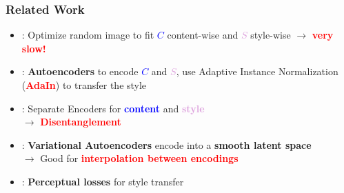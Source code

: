\documentclass[11pt,xcolor=dvipsnames]{beamer}
\begin{document}
\begin{frame}
\frametitle{Related Work}

\begin{itemize}
	\item \textcolor{gray}{\cite{gatys}}: Optimize random image to fit \textcolor{blue}{\textbf{$C$}} content-wise and \textcolor{Plum}{\textbf{$S$}} style-wise $\rightarrow$ \textbf{\textcolor{red}{very slow!}}
	\vspace{10pt}
	
	\item \textcolor{gray}{\cite{adain}}: \textbf{Autoencoders} to encode \textcolor{blue}{\textbf{$C$}} and \textcolor{Plum}{\textbf{$S$}}, use Adaptive Instance Normalization (\textbf{\textcolor{red}{AdaIn}}) to transfer the style
	\vspace{10pt}
	
	\item \textcolor{gray}{\cite{disentanglement}}: Separate Encoders for \textcolor{blue}{\textbf{content}} and \textcolor{Plum}{\textbf{style}} \\ $\rightarrow$ \textcolor{red}{\textbf{Disentanglement}}
	\vspace{10pt}
	
	\item \textcolor{gray}{\cite{vae}}: \textbf{Variational Autoencoders} encode into a \textbf{smooth latent space} \\
	$\rightarrow$ Good for \textcolor{red}{\textbf{interpolation between encodings}}
	\vspace{10pt}
	
	\item \textcolor{gray}{\cite{johnson}}: \textbf{Perceptual losses} for style transfer
	
\end{itemize}

\end{frame}
\end{document}

